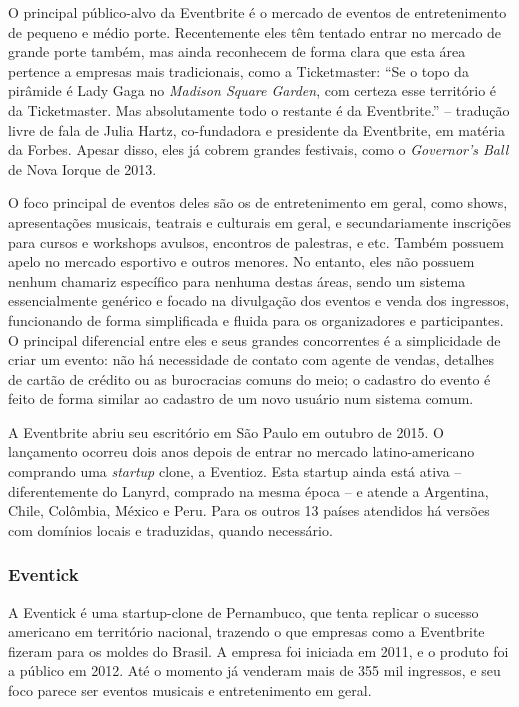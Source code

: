 \documentclass[12pt,a4paper,twoside,hyphens,english,brazil]{abntex2}
\begin{document}
O principal público-alvo da Eventbrite é o mercado de eventos de entretenimento de pequeno e médio porte. Recentemente eles têm tentado entrar no mercado de grande porte também, mas ainda reconhecem de forma clara que esta área pertence a empresas mais tradicionais, como a Ticketmaster: ``Se o topo da pirâmide é Lady Gaga no \emph{Madison Square Garden}, com certeza esse território é da Ticketmaster. Mas absolutamente todo o restante é da Eventbrite.'' -- tradução livre de fala de Julia Hartz, co-fundadora e presidente da Eventbrite, em matéria da Forbes\cite{eventbrite-lucro-forbes}. Apesar disso, eles já cobrem grandes festivais, como o \emph{Governor's Ball} de Nova Iorque de 2013.\cite{eventbrite-lucro-forbes}

O foco principal de eventos deles são os de entretenimento em geral, como shows, apresentações musicais, teatrais e culturais em geral, e secundariamente inscrições para cursos e workshops avulsos, encontros de palestras, e etc. Também possuem apelo no mercado esportivo e outros menores. No entanto, eles não possuem nenhum chamariz específico para nenhuma destas áreas, sendo um sistema essencialmente genérico e focado na divulgação dos eventos e venda dos ingressos, funcionando de forma simplificada e fluida para os organizadores e participantes. O principal diferencial entre eles e seus grandes concorrentes é a simplicidade de criar um evento: não há necessidade de contato com agente de vendas, detalhes de cartão de crédito ou as burocracias comuns do meio; o cadastro do evento é feito de forma similar ao cadastro de um novo usuário num sistema comum.

A Eventbrite abriu seu escritório em São Paulo em outubro de 2015\cite{eventbrite-sp}. O lançamento ocorreu dois anos depois de entrar no mercado latino-americano comprando uma \emph{startup} clone, a Eventioz\cite{eventbrite-eventioz}. Esta startup ainda está ativa -- diferentemente do Lanyrd, comprado na mesma época -- e atende a Argentina, Chile, Colômbia, México e Peru. Para os outros 13 países atendidos há versões com domínios locais e traduzidas, quando necessário.

\subsubsection*{Eventick}
A Eventick é uma startup-clone de Pernambuco, que tenta replicar o sucesso americano em território nacional, trazendo o que empresas como a Eventbrite fizeram para os moldes do Brasil. A empresa foi iniciada em 2011, e o produto foi a público em 2012.\cite{eventick-startupi} Até o momento já venderam mais de 355 mil ingressos\cite{eventick-home}, e seu foco parece ser eventos musicais e entretenimento em geral.
\end{document}
